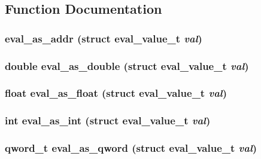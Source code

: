 \subsection{Function Documentation}
\subsubsection[{eval\_\-as\_\-addr}]{ eval\_\-as\_\-addr (struct {\bf eval\_\-value\_\-t} {\em val})}\label{eval_8h_ae5d008f853388e9d9d82ea31bc0a7c1}


\subsubsection[{eval\_\-as\_\-double}]{\setlength{\rightskip}{0pt plus 5cm}double eval\_\-as\_\-double (struct {\bf eval\_\-value\_\-t} {\em val})}\label{eval_8h_e95c4f593b6e6b3d6cce7f30d8af58a2}


\subsubsection[{eval\_\-as\_\-float}]{\setlength{\rightskip}{0pt plus 5cm}float eval\_\-as\_\-float (struct {\bf eval\_\-value\_\-t} {\em val})}\label{eval_8h_7e0674fdfa161a8d51c8578d7aa10ca4}


\subsubsection[{eval\_\-as\_\-int}]{\setlength{\rightskip}{0pt plus 5cm}int eval\_\-as\_\-int (struct {\bf eval\_\-value\_\-t} {\em val})}\label{eval_8h_a57f736a324e655178666fb1dc1d9edd}


\subsubsection[{eval\_\-as\_\-qword}]{\setlength{\rightskip}{0pt plus 5cm}qword\_\-t eval\_\-as\_\-qword (struct {\bf eval\_\-value\_\-t} {\em val})}\label{eval_8h_c81a46624fad18239e09f8ca09ac3fd7}


